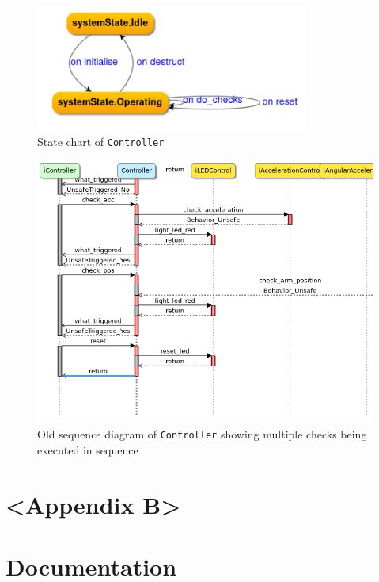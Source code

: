 \documentclass[12pt]{scrreprt}
\begin{document}
\begin{appendices}
\begin{figure}[H]
    \centering
    \includegraphics[width=0.8\textwidth]{Figures/results/modelling_figures/Controller/Controller_state_chart.png}
    \caption{State chart of \texttt{Controller}}
    \label{fig:controll_old}
\end{figure}


\begin{figure}[H]
    \centering
    \includegraphics[width=\textwidth]{Figures/results/modelling_figures/Controller/old_Controller_seq.png}
    \caption{Old sequence diagram of \texttt{Controller} showing multiple checks being executed in sequence}
    \label{fig:controll_old}
\end{figure}



\chapter{<Appendix B>}
\chapter{Documentation}
\end{appendices}
\end{document}
